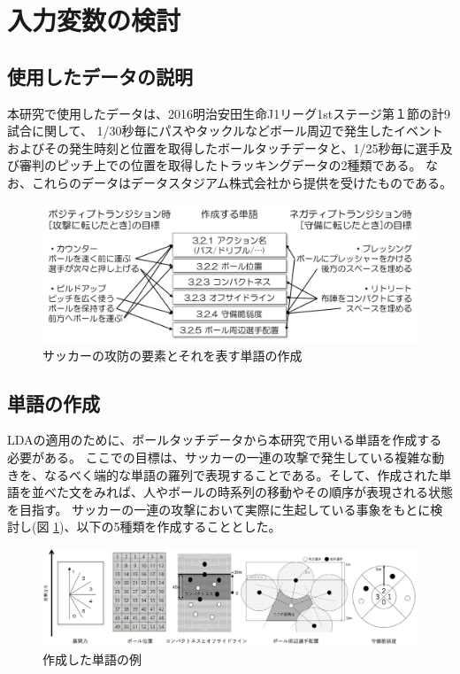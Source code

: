 \section{入力変数の検討}
\label{sec:input}

\subsection{使用したデータの説明}
本研究で使用したデータは、2016明治安田生命J1リーグ1stステージ第１節の計9試合に関して、
1/30秒毎にパスやタックルなどボール周辺で発生したイベントおよびその発生時刻と位置を取得したボールタッチデータと、1/25秒毎に選手及び審判のピッチ上での位置を取得したトラッキングデータの2種類である。
なお、これらのデータはデータスタジアム株式会社から提供を受けたものである。

\begin{figure}[t]
  \begin{center} %
    \includegraphics[width=12cm]{img/flow.png}
    \caption{サッカーの攻防の要素とそれを表す単語の作成}
    \label{fig:flow} %
  \end{center}
\end{figure}

\subsection{単語の作成}
LDAの適用のために、ボールタッチデータから本研究で用いる単語を作成する必要がある。
ここでの目標は、サッカーの一連の攻撃で発生している複雑な動きを、なるべく端的な単語の羅列で表現することである。そして、作成された単語を並べた文をみれば、人やボールの時系列の移動やその順序が表現される状態を目指す。
サッカーの一連の攻撃において実際に生起している事象をもとに検討し(図 \ref{fig:flow})、以下の5種類を作成することとした。



\begin{figure}[htbp]
  \begin{center} %
    \includegraphics[width=18cm]{img/word.png}
    \renewcommand{\baselinestretch}{1}%
    \caption{作成した単語の例}
    \label{fig:word}
  \end{center}
\end{figure}

